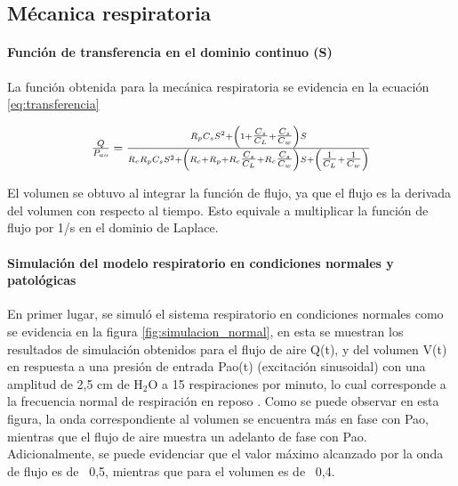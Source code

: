 \documentclass[journal]{IEEEtran}
\begin{document}
\subsection{Mécanica respiratoria}

\paragraph{Función de transferencia en el dominio continuo (S)}
La función obtenida para la mecánica respiratoria se evidencia en la ecuación \ref{eq:transferencia}

\begin{equation}
\scalebox{0.98}{$\frac{Q}{P_{ao}} = 
\frac{R_p C_s S^2 + \left(1 + \tfrac{C_s}{C_L} + \tfrac{C_s}{C_w}\right)S}
{R_c R_p C_s S^2
+ \left(R_c + R_p + R_c\tfrac{C_s}{C_L} + R_c\tfrac{C_s}{C_w}\right)S
+ \left(\tfrac{1}{C_L} + \tfrac{1}{C_w}\right)}$}
\label{eq:transferencia}
\end{equation}

El volumen se obtuvo al integrar la función de flujo, ya que el flujo es la derivada del volumen con respecto al tiempo. Esto equivale a multiplicar la función de flujo por 1/s en el dominio de Laplace.\bigskip

\paragraph{Simulación del modelo respiratorio en condiciones normales y patológicas}

En primer lugar, se simuló el sistema respiratorio en condiciones normales como se evidencia en la figura \ref{fig:simulacion_normal}, en esta se muestran los resultados de simulación obtenidos para el flujo de aire Q(t), y del volumen V(t) en respuesta a una presión de entrada Pao(t) (excitación sinusoidal) con una amplitud de 2,5 cm de H$_2$O a 15 respiraciones por minuto, lo cual corresponde a la frecuencia normal de respiración en reposo \cite{khoo2000physiological}. Como se puede observar en esta figura, la onda correspondiente al volumen se encuentra más en fase con Pao, mientras que el flujo de aire muestra un adelanto de fase con Pao. Adicionalmente, se puede evidenciar que el valor máximo alcanzado por la onda de flujo es de ~0,5, mientras que para el volumen es de ~0,4.
\end{document}

